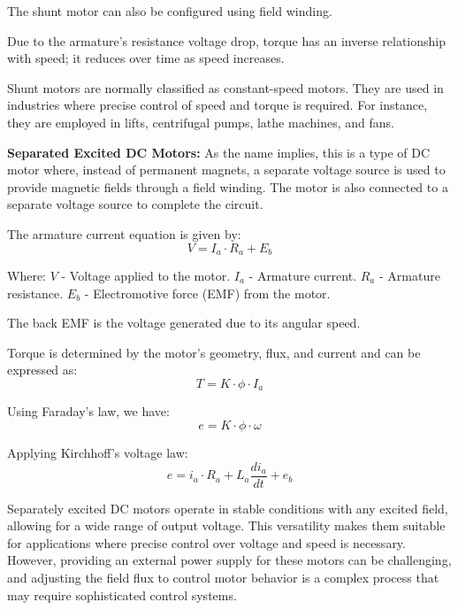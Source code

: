 \documentclass{article}
\begin{document}
\begin{flushleft}
The shunt motor can also be configured using field winding. \newline

Due to the armature's resistance voltage drop, torque has an inverse relationship with speed; it reduces over time as speed increases. \newline

Shunt motors are normally classified as constant-speed motors. They are used in industries where precise control of speed and torque is required. For instance, they are employed in lifts, centrifugal pumps, lathe machines, and fans. \newline
\vspace*{3pt}


\textbf{Separated Excited DC Motors:} As the name implies, this is a type of DC motor where, instead of permanent magnets, a separate voltage source is used to provide magnetic fields through a field winding. The motor is also connected to a separate voltage source to complete the circuit.

The armature current equation is given by:
\[ V = I_a \cdot R_a + E_b \]

Where:
\( V \) - Voltage applied to the motor.
\( I_a \) - Armature current.
\( R_a \) - Armature resistance.
\( E_b \) - Electromotive force (EMF) from the motor.

The back EMF is the voltage generated due to its angular speed.

Torque is determined by the motor's geometry, flux, and current and can be expressed as:
\[ T = K \cdot \phi \cdot I_a \]

Using Faraday's law, we have:
\[ e = K \cdot \phi \cdot \omega \]

Applying Kirchhoff's voltage law:
\[ e = i_a \cdot R_a + L_a \frac{di_a}{dt} + e_b \]


Separately excited DC motors operate in stable conditions with any excited field, allowing for a wide range of output voltage. This versatility makes them suitable for applications where precise control over voltage and speed is necessary. However, providing an external power supply for these motors can be challenging, and adjusting the field flux to control motor behavior is a complex process that may require sophisticated control systems.
\newline
\vspace*{3pt}


\end{flushleft}
\end{document}
